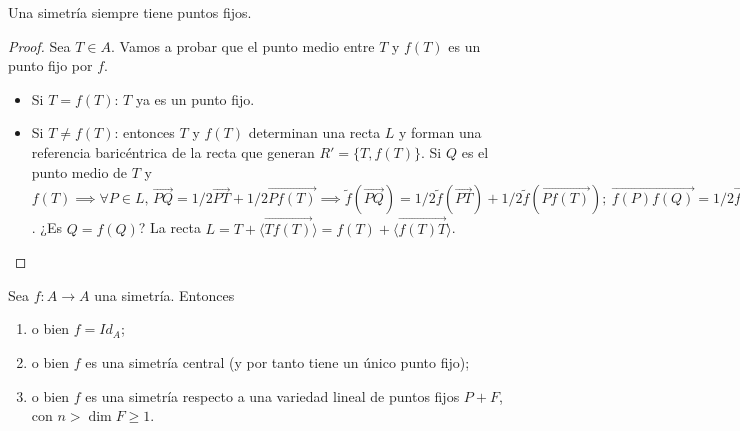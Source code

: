 \documentclass[14pt]{book}
\begin{document}
\begin{obs}
	Una simetría siempre tiene puntos fijos.
\end{obs}
\begin{proof}
	Sea $T \in A$. Vamos a probar que el punto medio entre $T$ y $f(T)$ es un punto fijo por $f$.
	\begin{itemize}
		\item Si $T = f(T)$: $T$ ya es un punto fijo.
		\item Si $T ≠ f(T)$: entonces $T$ y $f(T)$ determinan una recta $L$ y forman una referencia baricéntrica de la recta que generan $R' = \{T, f(T)\}$.  Si $Q$ es el punto medio de $T$ y $f(T) \implies \forall P \in L,\, \overrightarrow{PQ} = 1/2 \overrightarrow{PT} + 1/2\overrightarrow{Pf(T)} \implies \tilde{f}(\overrightarrow{PQ}) = 1/2 \tilde{f}(\overrightarrow{PT}) + 1/2\tilde{f}(\overrightarrow{Pf(T)});\ \overrightarrow{f(P)f(Q)} = 1/2 \overrightarrow{f(P) f(T)} + 1/2 \overrightarrow{f(P f^2(T))} = 1/2 \overrightarrow{f(P)f(T)} + 1/2 \overrightarrow{f(P)T}$. ¿Es $Q = f(Q)$? La recta $L = T + \langle \overrightarrow{Tf(T)}\rangle = f(T) + \langle \overrightarrow{f(T) T}\rangle$.
	\end{itemize}
\end{proof}

\begin{tm}
	Sea $f: A \to A$ una simetría. Entonces
	\begin{enumerate}
		\item o bien $f = Id_A$;
		\item o bien $f$ es una simetría central (y por tanto tiene un único punto fijo);
		\item o bien $f$ es una simetría respecto a una variedad lineal de puntos fijos $P + F$, con $n > \dim F \geq 1$.
	\end{enumerate}
\end{tm}
\end{document}
